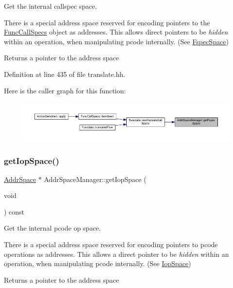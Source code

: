 Get the internal callspec space. 

There is a special address space reserved for encoding pointers to the \mbox{\hyperlink{class_func_call_specs}{Func\+Call\+Specs}} object as addresses. This allows direct pointers to be {\itshape hidden} within an operation, when manipulating pcode internally. (See \mbox{\hyperlink{class_fspec_space}{Fspec\+Space}}) \begin{DoxyReturn}{Returns}
a pointer to the address space 
\end{DoxyReturn}


Definition at line 435 of file translate.\+hh.

Here is the caller graph for this function\+:
\nopagebreak
\begin{figure}[H]
\begin{center}
\leavevmode
\includegraphics[width=350pt]{class_addr_space_manager_a734131c0626a1cfbbfd3cb0e93ecba28_icgraph}
\end{center}
\end{figure}
\mbox{\label{class_addr_space_manager_a2175a095b07fef420632724cacc10354}} 
\subsubsection{\texorpdfstring{getIopSpace()}{getIopSpace()}}
{\footnotesize\ttfamily \mbox{\hyperlink{class_addr_space}{Addr\+Space}} $\ast$ Addr\+Space\+Manager\+::get\+Iop\+Space (\begin{DoxyParamCaption}\item[{void}]{ }\end{DoxyParamCaption}) const\hspace{0.3cm}{\ttfamily [inline]}}



Get the internal pcode op space. 

There is a special address space reserved for encoding pointers to pcode operations as addresses. This allows a direct pointer to be {\itshape hidden} within an operation, when manipulating pcode internally. (See \mbox{\hyperlink{class_iop_space}{Iop\+Space}}) \begin{DoxyReturn}{Returns}
a pointer to the address space 
\end{DoxyReturn}


